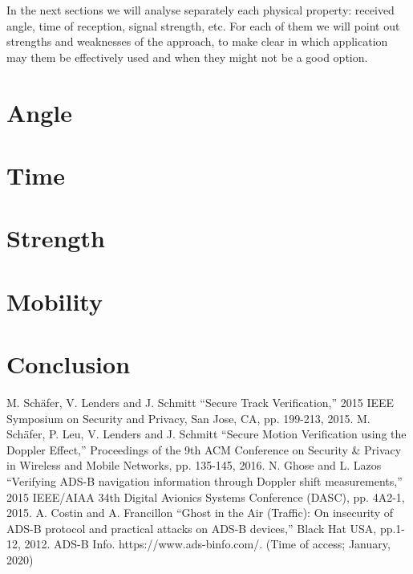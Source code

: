 \documentclass[conference]{IEEEtran}
\begin{document}
In the next sections we will analyse separately each physical property: received angle, time of reception, signal strength, etc. For each of them we will point out strengths and weaknesses of the approach, to make clear in which application may them be effectively used and when they might not be a good option.

\section{Angle}
%

\section{Time}
%

\section{Strength}
%

\section{Mobility}


\section{Conclusion}

\begin{thebibliography}{00}
 M. Schäfer, V. Lenders and J. Schmitt ``Secure Track Verification,'' 2015 IEEE Symposium on Security and Privacy, San Jose, CA, pp. 199-213, 2015.
 M. Schäfer, P. Leu, V. Lenders and J. Schmitt ``Secure Motion Verification using the Doppler Effect,'' Proceedings of the 9th ACM Conference on Security \& Privacy in Wireless and Mobile Networks, pp. 135-145, 2016.
 N. Ghose and L. Lazos ``Verifying ADS-B navigation information through Doppler shift measurements,'' 2015 IEEE/AIAA 34th Digital Avionics Systems Conference (DASC), pp. 4A2-1, 2015.
 A. Costin and A. Francillon ``Ghost in the Air (Traffic): On insecurity of ADS-B protocol and practical attacks on ADS-B devices,'' Black Hat USA, pp.1-12, 2012.
ADS-B Info. https://www.ads-binfo.com/. (Time of access; January, 2020)
\end{thebibliography}
\end{document}
